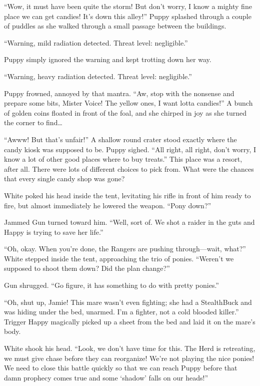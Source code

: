 ``Wow, it must have been quite the storm! But don't worry, I know a mighty fine place we can get candies! It's down this alley!'' Puppy splashed through a couple of puddles as she walked through a small passage between the buildings.

{\mt ``Warning, mild radiation detected. Threat level: negligible.''}

Puppy simply ignored the warning and kept trotting down her way.

{\mt ``Warning, heavy radiation detected. Threat level: negligible.''}

Puppy frowned, annoyed by that mantra. ``Aw, stop with the nonsense and prepare some bits, Mister Voice! The yellow ones, I want lotta candies!'' A bunch of golden coins floated in front of the foal, and she chirped in joy as she turned the corner to find\dots

``Awww! But that's unfair!'' A shallow round crater stood exactly where the candy kiosk was supposed to be. Puppy sighed. ``All right, all right, don't worry, I know a lot of other good places where to buy treats.'' This place was a resort, after all. There were lots of different choices to pick from. What were the chances that every single candy shop was gone?



\horizonline


White poked his head inside the tent, levitating his rifle in front of him ready to fire, but almost immediately he lowered the weapon. ``Pony down?''

Jammed Gun turned toward him. ``Well, sort of. We shot a raider in the guts and Happy is trying to save her life.''

``Oh, okay. When you're done, the Rangers are pushing through---wait, what?'' White stepped inside the tent, approaching the trio of ponies. ``Weren't we supposed to shoot them down? Did the plan change?''

Gun shrugged. ``Go figure, it has something to do with pretty ponies.''

``Oh, shut up, Jamie! This mare wasn't even fighting; she had a StealthBuck and was hiding under the bed, unarmed. I'm a fighter, not a cold blooded killer.'' Trigger Happy magically picked up a sheet from the bed and laid it on the mare's body.

White shook his head. ``Look, we don't have time for this. The Herd is retreating, we must give chase before they can reorganize! We're not playing the nice ponies! We need to close this battle quickly so that we can reach Puppy before that damn prophecy comes true and some `shadow' falls on our heads!''


